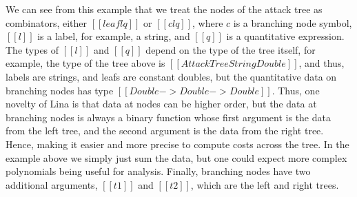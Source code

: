We can see from this example that we treat the nodes of the attack
tree as combinators, either $[[leaf l q]]$ or $[[c l q]]$, where $c$
is a branching node symbol, $[[l]]$ is a label, for example, a string,
and $[[q]]$ is a quantitative expression.  The types of $[[l]]$ and
$[[q]]$ depend on the type of the tree itself, for example, the type
of the tree above is $[[AttackTree String Double]]$, and thus, labels
are strings, and leafs are constant doubles, but the quantitative data
on branching nodes has type $[[Double -> Double -> Double]]$. Thus,
one novelty of Lina is that data at nodes can be higher order, but the
data at branching nodes is always a binary function whose first
argument is the data from the left tree, and the second argument is
the data from the right tree. Hence, making it easier and more precise
to compute costs across the tree.  In the example above we simply just
sum the data, but one could expect more complex polynomials being
useful for analysis.  Finally, branching nodes have two additional
arguments, $[[t1]]$ and $[[t2]]$, which are the left and right trees.

